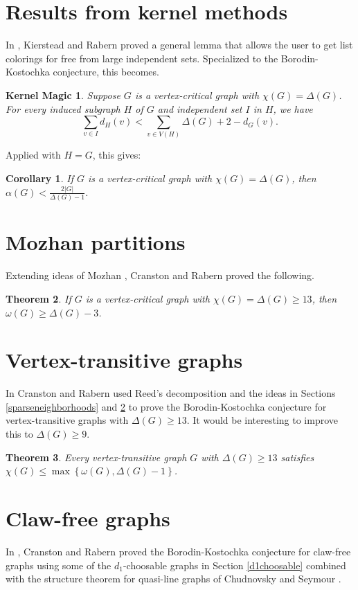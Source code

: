 \documentclass[12pt]{article}
\theoremstyle{plain}
\newtheorem{thm}{Theorem}
\newtheorem{cor}[thm]{Corollary}
\newtheorem*{KernelMagic}{Kernel Magic}
\theoremstyle{definition}
\theoremstyle{remark}
\newcommand{\set}[1]{\left\{ #1 \right\}}
\newcommand{\card}[1]{\left|#1\right|}
\begin{document}
\section{Results from kernel methods}
In \cite{KernelMagic}, Kierstead and Rabern proved a general lemma that allows the user to get list colorings for free from large independent sets.  
Specialized to the Borodin-Kostochka conjecture,
this becomes.

\begin{KernelMagic}
Suppose $G$ is a vertex-critical graph with $\chi(G) = \Delta(G)$.  For every induced subgraph $H$ of $G$ and independent set $I$ in $H$, we have
\[\sum_{v \in I} d_H(v) < \sum_{v \in V(H)} \Delta(G) + 2 - d_G(v).\]
\end{KernelMagic}

Applied with $H=G$, this gives:
\begin{cor}
If $G$ is a vertex-critical graph with $\chi(G) = \Delta(G)$, then $\alpha(G) < \frac{2\card{G}}{\Delta(G)-1}$.
\end{cor}

\section{Mozhan partitions}\label{shuffle}
Extending ideas of Mozhan \cite{mozhan1983}, Cranston and Rabern \cite{bigcliques} proved the following.
\begin{thm}
If $G$ is a vertex-critical graph with $\chi(G) = \Delta(G) \ge 13$, then $\omega(G) \ge \Delta(G) - 3$.
\end{thm}

\section{Vertex-transitive graphs}
In \cite{vertextransitive} Cranston and Rabern used Reed's decomposition and the ideas in Sections \ref{sparseneighborhoods} and \ref{shuffle} to prove 
the Borodin-Kostochka conjecture for vertex-transitive graphs with $\Delta(G) \ge 13$.  It would be interesting to improve this to $\Delta(G) \ge 9$.

\begin{thm}
Every vertex-transitive graph $G$ with $\Delta(G) \ge 13$ satisfies $\chi(G) \le \max\set{\omega(G), \Delta(G) - 1}$.
\end{thm}

\section{Claw-free graphs}
In \cite{cranstonrabernclaw}, Cranston and Rabern proved the Borodin-Kostochka conjecture for claw-free graphs using some of the $d_1$-choosable graphs in Section \ref{d1choosable} 
combined with the structure theorem for quasi-line graphs of Chudnovsky and Seymour \cite{chudnovsky2005structure}.


\end{document}
